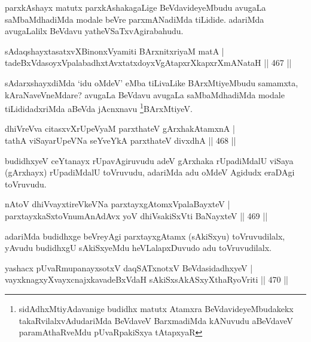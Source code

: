 \begin{artha}
parxkAshayx matutx parxkAshakagaLige BeVdavideyeMbudu avugaLa saMbaMdhadiMda modale beVre parxmANadiMda tiLidide. adariMda avugaLalilx BeVdavu yatheVSaTxvAgirabahudu.
\end{artha}

\begin{shl}
sAdaqshayxtasatxvXBinonxV\s yamiti BArxnitxriyaM matA | \\
tadeBxVdasoyxVpalabadhxtAvxtatxdoyxVgAtapxrXkapxrXmANataH \hfill||  467 ||  
\end{shl}

\begin{artha}
sAdarxshayxdiMda `idu oMdeV' eMba tiLivaLike BArxMtiyeMbudu samamxta, kAraNaveVneMdare? avugaLa BeVdavu avugaLa saMbaMdhadiMda modale tiLididadxriMda aBeVda jAcnxnavu \footnote{sidAdhxMtiyAdavanige budidhx matutx Atamxra BeVdavideyeMbudakekx takaRvilalxvAdudariMda BeVdaveV BarxmadiMda kANuvudu aBeVdaveV paramAthaRveMdu pUvaRpakiSxya tAtapxyaR}BArxMtiyeV.
\end{artha}

\begin{shl}
dhiVreVva citasxvXrUpeVyaM parxthateV gArxhakAtamxnA | \\
tathA viSayarUpeVNa seYveYkA parxthateV divxdhA \hfill||  468 ||  
\end{shl}

\begin{artha}
budidhxyeV ceYtanayx rUpavAgiruvudu adeV gArxhaka rUpadiMdalU viSaya (gArxhayx) rUpadiMdalU toVruvudu, adariMda adu oMdeV Agidudx eraDAgi toVruvudu.
\end{artha}

\begin{shl}
nAtoV dhiVvayxtireVkeVNa parxtayxgAtomxVpalaBayxteV | \\
parxtayxkaSxtoV\s numAnAdAvx yoV dhiVsakiSxVti BaNayxteV \hfill||  469 ||  
\end{shl}

\begin{artha}
adariMda budidhxge beVreyAgi parxtayxgAtamx (sAkiSxyu) toVruvudilalx, yAvudu budidhxgU sAkiSxyeMdu heVLalapxDuvudo adu toVruvudilalx.
\end{artha}

\begin{shl}
yashacx pUvaRmupanayxsotxV daqSATxnotxV BeVdasidadhxyeV | \\
vayxknagxyXvayxcnajxkavadeBxVdaH sAkiSxsAkASxyXthaRyoVriti \hfill||  470 ||  
\end{shl}
				
